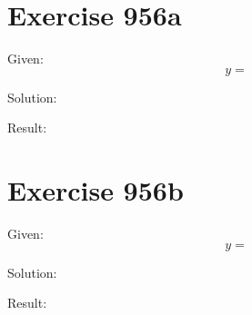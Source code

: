 \documentclass[a4paper, 10pt]{scrartcl}
\begin{document}
\section{Exercise 956a}

Given:
\[
y = 
\]

Solution:

Result:

\section{Exercise 956b}

Given:
\[
y = 
\]

Solution:

Result:
\end{document}
